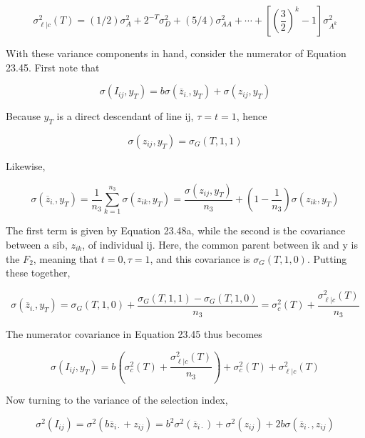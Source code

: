 \documentclass{article}
\begin{document}
\begin{equation}
\sigma_{\ell|c}^{2}(T)=(1/2)\sigma_{A}^{2}+2^{-T}\sigma_{D}^{2}+(5/4)\sigma_{A A}^{2}+\cdots+\left[\left(\frac{3}{2}\right)^{k}-1\right]\sigma_{A^{k}}^{2}
\tag{23.47b}
\label{eq:23_47b}
\end{equation}

With these variance components in hand, consider the numerator of Equation 23.45. First note that

\begin{equation}
\sigma(I_{ij},y_{T})=b\sigma(\overline{z}_{i.},y_{T})+\sigma(z_{ij},y_{T})
\end{equation}

Because  $ y_{T} $ is a direct descendant of line ij,  $ \tau = t = 1 $, hence

\begin{equation}
\sigma(z_{ij},y_{T})=\sigma_{G}(T,1,1)
\tag{23.48a}
\label{eq:23_48a}
\end{equation}

Likewise,

\begin{equation}
\sigma(\overline{z}_{i.},y_{T})=\frac{1}{n_{3}}\sum_{k=1}^{n_{3}}\sigma(z_{ik},y_{T})=\frac{\sigma(z_{ij},y_{T})}{n_{3}}+\left(1-\frac{1}{n_{3}}\right)\sigma(z_{ik},y_{T})
\end{equation}

The first term is given by Equation 23.48a, while the second is the covariance between a sib,  $ z_{ik} $, of individual ij. Here, the common parent between ik and y is the  $ F_2 $, meaning that  $ t = 0, \tau = 1 $, and this covariance is  $ \sigma_G(T, 1, 0) $. Putting these together,

\begin{equation}
\sigma(\overline{z}_{i.},y_{T})=\sigma_{G}(T,1,0)+\frac{\sigma_{G}(T,1,1)-\sigma_{G}(T,1,0)}{n_{3}}=\sigma_{c}^{2}(T)+\frac{\sigma_{\ell|c}^{2}(T)}{n_{3}}
\tag{23.48b}
\label{eq:23_48b}
\end{equation}

The numerator covariance in Equation 23.45 thus becomes

\begin{equation}
\sigma(I_{ij},y_{T})=b\left(\sigma_{c}^{2}(T)+\frac{\sigma_{\ell|c}^{2}(T)}{n_{3}}\right)+\sigma_{c}^{2}(T)+\sigma_{\ell|c}^{2}(T)
\tag{23.49}
\label{eq:23_49}
\end{equation}

Now turning to the variance of the selection index,

\begin{equation}
\sigma^{2}(I_{i j})=\sigma^{2}\left(b\overline{{z}}_{i\cdot}+z_{i j}\right)=b^{2}\sigma^{2}\left(\overline{{z}}_{i\cdot}\right)+\sigma^{2}\left(z_{i j}\right)+2b\sigma\left(\overline{{z}}_{i\cdot},z_{i j}\right)
\tag{23.50a}
\label{eq:23_50a}
\end{equation}
\end{document}
